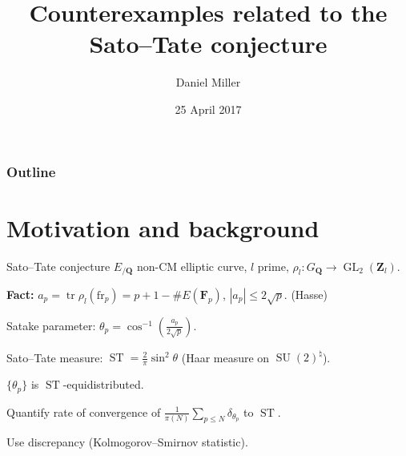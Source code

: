 \documentclass{beamer}
\title{Counterexamples related to the Sato--Tate conjecture}
\author{Daniel Miller}
\institute{Cornell University}
\date{25 April 2017}
\DeclareMathOperator{\GL}{GL}
\DeclareMathOperator{\ST}{ST}
\DeclareMathOperator{\SU}{SU}
\DeclareMathOperator{\tr}{tr}
\newcommand{\bF}{\mathbf{F}}
\newcommand{\bQ}{\mathbf{Q}}
\newcommand{\bZ}{\mathbf{Z}}
\newcommand{\frob}{\mathrm{fr}}
\begin{document}
\begin{frame}
\titlepage
\end{frame}



\begin{frame}
\frametitle{Outline}
\tableofcontents
\end{frame}





\section{Motivation and background}

\begin{frame}{Sato--Tate conjecture}
$E_{/\bQ}$ non-CM elliptic curve, $l$ prime, $\rho_l\colon G_\bQ \to \GL_2(\bZ_l)$. 
\pause

\textbf{Fact:}
$a_p = \tr\rho_l(\frob_p) = p+1 - \# E(\bF_p)$, 
\pause
$|a_p|\leqslant 2\sqrt p$. 
\pause
(Hasse) %
\pause

Satake parameter: $\theta_p = \cos^{-1}\left( \frac{a_p}{2\sqrt p}\right)$. 
\pause

Sato--Tate measure: $\ST = \frac{2}{\pi} \sin^2 \theta$ 
\pause
(Haar measure on $\SU(2)^\natural$). 
\pause

\begin{theorem}
$\{\theta_p\}$ is $\ST$-equidistributed. 
\end{theorem}
\pause

Quantify rate of convergence of 
$\frac{1}{\pi(N)} \sum_{p\leqslant N} \delta_{\theta_p}$ to $\ST$. 
\pause

Use discrepancy (Kolmogorov--Smirnov statistic). 
\end{frame}
\end{document}
